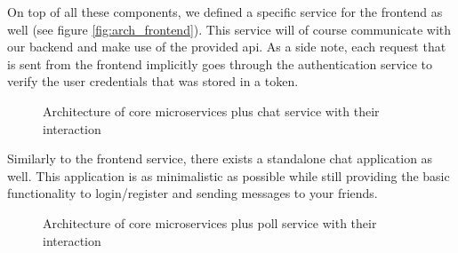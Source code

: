 \documentclass{article}
\begin{document}
On top of all these components, we defined a specific service for the frontend as well (see figure \ref{fig:arch_frontend}). This service will of course communicate with our backend and make use of the provided api. As a side note, each request that is sent from the frontend implicitly goes through the authentication service to verify the user credentials that was stored in a token.

\begin{figure}[H]
    \begin{center}
    \end{center}
    \caption{Architecture of core microservices plus chat service with their interaction}
    \label{fig:arch_chat}
\end{figure}

Similarly to the frontend service, there exists a standalone chat application as well. This application is as minimalistic as possible while still providing the basic functionality to login/register and sending messages to your friends.

\begin{figure}[H]
    \begin{center}
    \end{center}
    \caption{Architecture of core microservices plus poll service with their interaction}
    \label{fig:arch_poll}
\end{figure}
\end{document}
